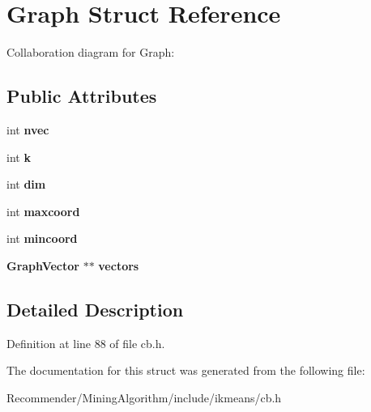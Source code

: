 \section{Graph Struct Reference}
\label{structGraph}
Collaboration diagram for Graph:\subsection*{Public Attributes}
\begin{CompactItemize}
\item 
int {\bf nvec}\label{structGraph_95a300ad18ff85238e883fd600bcd8b2}

\item 
int {\bf k}\label{structGraph_b66ed8e0098c0a86b458672a55a9cca9}

\item 
int {\bf dim}\label{structGraph_70b5e28b5bc3d1b63a7435c5fe50b837}

\item 
int {\bf maxcoord}\label{structGraph_6b54925ce7bfa2ce7b12a86fd682e558}

\item 
int {\bf mincoord}\label{structGraph_8edea08b2382afffba6ebc384c26cd35}

\item 
{\bf GraphVector} $\ast$$\ast$ {\bf vectors}\label{structGraph_34e383008063eedaa465e24ae76c4592}

\end{CompactItemize}


\subsection{Detailed Description}




Definition at line 88 of file cb.h.

The documentation for this struct was generated from the following file:\begin{CompactItemize}
\item 
Recommender/MiningAlgorithm/include/ikmeans/cb.h\end{CompactItemize}
